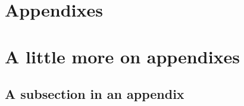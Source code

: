 \documentclass[%
 reprint,
 amsmath,amssymb,
 aps,
]{revtex4-2}
\begin{document}
\begin{acknowledgments}

\end{acknowledgments}

\appendix

\section{Appendixes}

\section{A little more on appendixes}


\subsection{\label{app:subsec}A subsection in an appendix}





\end{document}
